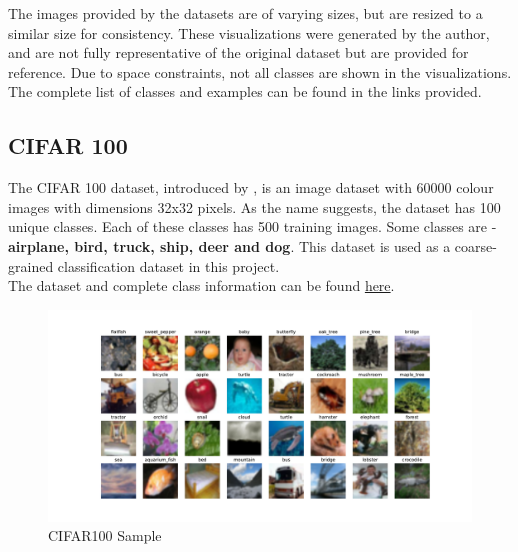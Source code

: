The images provided by the datasets are of varying sizes, but are resized to a similar size for consistency. These visualizations were generated by the author, and are not fully representative of the original dataset but are provided for reference. Due to space constraints, not all classes are shown in the visualizations. The complete list of classes and examples can be found in the links provided.

\subsection{CIFAR 100}
The CIFAR 100 dataset, introduced by \cite{krizhevskyLearningMultipleLayers}, is an image dataset with 60000 colour images with dimensions 32x32 pixels. As the name suggests, the dataset has 100 unique classes. Each of these classes has 500 training images. Some classes are - \textbf{airplane, bird, truck, ship, deer and dog}. This dataset is used as a coarse-grained classification dataset in this project.\\
The dataset and complete class information can be found \href{https://www.kaggle.com/datasets/fedesoriano/cifar100}{here}.



\begin{figure}[H]
    \centering
    \includegraphics[width=1\textwidth]{images/cifar100.pdf}
    \caption{CIFAR100 Sample}
    \label{fig:cifar100}
\end{figure}

